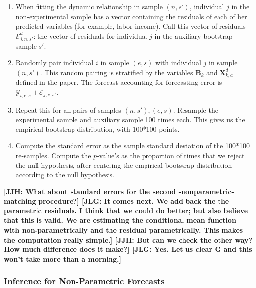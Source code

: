 \begin{enumerate}
\item When fitting the dynamic relationship in sample $(n,s')$, individual $j$ in the non-experimental sample has a vector containing the residuals of each of her predicted variables (for example, labor income). Call this vector of residuals $\bm{\mathcal{E}}_{j,n,s'}^d$: the vector of residuals for individual $j$ in the auxiliary bootstrap sample $s'$.

\item Randomly pair individual $i$ in sample $(e,s)$ with individual $j$ in sample $(n,s')$. This random pairing is stratified by the variables $\bm{B}_k$ and $\bm{X}_{k,a}^d$ defined in the paper. The forecast accounting for forecasting error is $\mathcal{Y}_{i,e,s}+ \bm{\mathcal{E}}_{j,e,s'}$.

\item Repeat this for all pairs of samples $(n,s'), (e,s)$. Resample the experimental sample and auxiliary sample 100 times each. This gives us the empirical bootstrap distribution, with 100*100 points.

\item Compute the standard error as the sample standard deviation of the 100*100 re-samples. Compute the $p$-value's as the proportion of times that we reject the null hypothesis, after centering the empirical bootstrap distribution according to the null hypothesis.
\end{enumerate}

\noindent \textbf{[JJH: What about standard errors for the second -nonparametric- matching procedure?] [JLG: It comes next. We add back the the parametric residuals. I think that we could do better; but also believe that this is valid. We are estimating the conditional mean function with non-parametrically and the residual parametrically. This makes the computation really simple.] [JJH: But can we check the other way? How much difference does it make?] [JLG: Yes. Let us clear G and this won't take more than a morning.]}

\subsubsection{Inference for Non-Parametric Forecasts}


